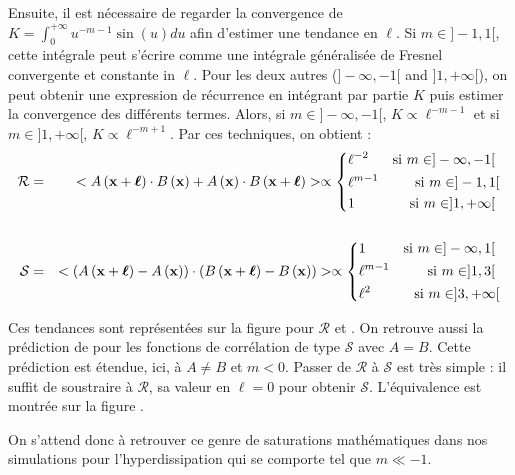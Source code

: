 Ensuite, il est nécessaire de regarder la convergence de $K = \int_0^{+\infty} u^{-m-1} \sin\left(u\right) du$ afin d'estimer une tendance en $\ell$. Si $m \in ]-1,1[$, cette intégrale peut s'écrire comme une intégrale généralisée de Fresnel convergente et constante in $\ell$. Pour les deux autres ($]-\infty,-1[$ and $]1,+\infty[$), on peut obtenir une expression de récurrence en intégrant par partie $K$ puis estimer la convergence des différents termes. Alors, si $m \in ]-\infty,-1[$, $K\propto \ell^{-m-1}$ et si $m \in ]1,+\infty[$, $K\propto \ell^{-m+1}$. Par ces techniques, on obtient :
\begin{eqnarray}
    \mathcal{R} &=& <A\left({\bf x} + \boldsymbol{\ell}\right)  \cdot B\left({\bf x}\right) + A\left({\bf x}\right)  \cdot B\left({\bf x} + \boldsymbol{\ell}\right)> 
\propto \left\{
    \begin{split}
    &\ell^{-2}& \textrm{si $m \in ]-\infty,-1[$ } \\
 &\ell^{m-1}&  \textrm{si $m \in ]-1,1[$}  \\
 &1& \textrm{si $m \in ]1,+\infty[$ } 
\end{split}
\right.\nonumber  \\
&&\\
   \mathcal{S} &=& <\left(A\left({\bf x} + \boldsymbol{\ell}\right) - A\left({\bf x}\right)\right)\cdot\left(B\left({\bf x} + \boldsymbol{\ell}\right) - B\left({\bf x}\right)\right) > 
\propto \left\{
    \begin{split}
    & 1 & \textrm{si $m \in ]-\infty,1[$ } \\
& \ell^{m-1}&  \textrm{si $m \in ]1,3[$ }  \\
& \ell^2 & \textrm{si $m \in ]3,+\infty[$}
\end{split}
\right. \nonumber\\
\end{eqnarray}


Ces tendances sont représentées sur la figure  pour $\mathcal{R}$ et . On retrouve aussi la prédiction de \cite{cho_simulations_2009} pour les fonctions de corrélation de type $\mathcal{S}$ avec $A=B$. Cette prédiction est étendue, ici, à $A\neq B$ et $m<0$. Passer de $\mathcal{R}$ à $\mathcal{S}$ est très simple : il suffit de soustraire à $\mathcal{R}$, sa valeur en $\ell = 0$ pour obtenir $\mathcal{S}$. L'équivalence est montrée sur la figure . 

On s'attend donc à retrouver ce genre de saturations mathématiques dans nos simulations pour l'hyperdissipation qui se comporte tel que $m \ll -1$.

